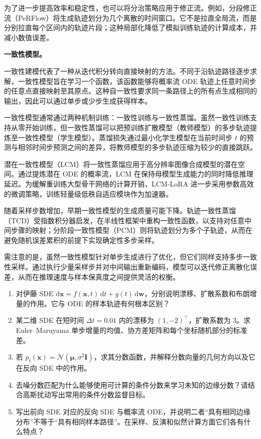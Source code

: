 \documentclass[UTF8,a4paper,zihao=-4,oneside,openany]{ctexbook}
\begin{document}
为了进一步提高效率和稳定性，也可以将分治策略应用于修正流。例如，分段修正流（PeRFlow）将生成轨迹划分为几个离散的时间窗口。它不是拉直全局流，而是分别拉直每个区间内的轨迹片段；这种局部化降低了模拟训练轨迹的计算成本，并减小数值误差。

\textbf{一致性模型。}

一致性建模代表了一种从迭代积分转向直接映射的方法。不同于沿轨迹路径逐步求解，一致性模型旨在学习一个函数，该函数能够将概率流 ODE 轨迹上任意时间步的任意点直接映射至其原点。这种自一致性要求同一条路径上的所有点生成相同的输出，因此可以通过单步或少步生成获得样本。

一致性模型通常通过两种机制训练：一致性训练与一致性蒸馏。虽然一致性训练支持从零开始训练，但一致性蒸馏可以把预训练扩散模型（教师模型）的多步轨迹提炼至一致性模型（学生模型）。蒸馏损失通过最小化学生模型在当前时间步 $t$ 的预测与相邻时间步预测之间的差异，将教师模型的多步轨迹压缩为较少的直接跳跃。

潜在一致性模型（LCM）将一致性蒸馏应用于高分辨率图像合成模型的潜在空间。通过提炼潜在 ODE 的概率流，LCM 在保持母模型生成能力的同时降低推理延迟。为缓解重训练大型骨干网络的计算开销，LCM-LoRA 进一步采用参数高效的微调策略，训练轻量级低秩自适应模块作为加速器。

随着采样步数增加，早期一致性模型的生成质量可能下降。轨迹一致性蒸馏（TCD）受指数积分器启发，在半线性框架中重构一致性函数，以支持对任意中间步骤的映射；分阶段一致性模型（PCM）则将轨迹划分为多个子轨迹，从而在避免随机误差累积的前提下实现确定性多步采样。

需注意的是，虽然一致性模型针对单步生成进行了优化，但它们同样支持多步一致性采样。通过执行少量采样步并对中间输出重新编码，模型可以迭代修正离散化误差，从而在推理速度与样本保真度之间提供灵活的权衡。

\begin{exercisebox}
  \begin{enumerate}
    \item 对伊藤 SDE \(\mathrm d\boldsymbol x=f(\boldsymbol x,t)\,\mathrm dt+g(t)\,\mathrm d\boldsymbol w\)，分别说明漂移、扩散系数和布朗增量的作用。它与 ODE 的样本轨迹有何根本区别？
    \item 某二维 SDE 在短时间 \(\Delta t=0.01\) 内的漂移为 \((1,-2)^\top\)，扩散系数为 \(3\)。求 Euler--Maruyama 单步增量的均值、协方差矩阵和每个坐标随机部分的标准差。
    \item 若 \(p_t(\boldsymbol x)=\mathcal N(\boldsymbol\mu,\sigma^2\boldsymbol I)\)，求其分数函数，并解释分数向量的几何方向以及它在反向 SDE 中的作用。
    \item 去噪分数匹配为什么能够使用可计算的条件分数来学习未知的边缘分数？请结合高斯扰动写出常用的条件分数监督目标。
    \item 写出前向 SDE 对应的反向 SDE 与概率流 ODE，并说明二者“具有相同边缘分布”不等于“具有相同样本路径”。在采样、反演和似然计算方面它们各有什么特点？
  \end{enumerate}
\end{exercisebox}
\end{document}
